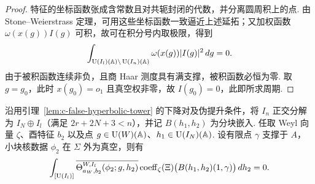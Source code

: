 \begin{proof}
特征的坐标函数张成含常数且对共轭封闭的代数，并分离圆周积上的点. 由 Stone--Weierstrass 定理，可用这些坐标函数一致逼近上述延拓；又加权函数 $\omega(x(g))I(g)$ 可积，故可在积分号内取极限，得到
\[
 \int_{\operatorname{U}(I_l)(\mathbb A)\backslash \operatorname{U}(I_n)(\mathbb A)}
              \omega(x(g))|I(g)|^2\,dg=0 .
\]
由于被积函数连续非负，且商 Haar 测度具有满支撑，被积函数必恒为零. 取 $g=g_0$，此时 $x(g_0)=o_1$ 且真空权非零，故 $I(g_0)=0$，此即所求周期.
\end{proof}

\begin{lemma}
\label{lem:c-false-kernel-period}
\emitthmsource
沿用引理~\ref{lem:c-false-hyperbolic-tower} 的下降对及伪提升条件，将 $I_n$ 正交分解为 $I_N\oplus I_l$（满足 $2r+2N+3<n$），并记 $B(h_1,h_2)$ 为分块嵌入. 任取 Weyl 向量 $\zeta$、酉特征 $b_2$ 以及点 $g\in \operatorname{U}(W)(\mathbb A)$、$h_1\in \operatorname{U}(I_N)(\mathbb A)$. 设有限点 $\gamma$ 支撑于 $A$，小块核数据 $\phi_2$ 在 $\Sigma$ 外为真空，则有
\[
 \int_{[\operatorname{U}(I_l)]} \overline{\Theta^{W,I_l}_{a_W,b_2}(\phi_2;g,h_2)}
    \operatorname{coeff}_\zeta(\Xi)\bigl(B(h_1,h_2)(1,\gamma)\bigr)\,dh_2=0 .
\]
\end{lemma}

